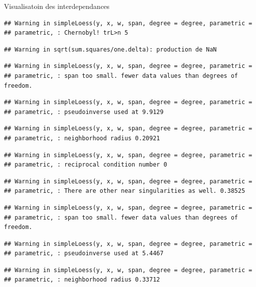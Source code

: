\documentclass[11pt,ignorenonframetext,]{beamer}
\begin{document}
\begin{frame}[fragile]{Visualisatoin des interdependances}
\begin{verbatim}
## Warning in simpleLoess(y, x, w, span, degree = degree, parametric =
## parametric, : Chernobyl! trL>n 5
\end{verbatim}

\begin{verbatim}
## Warning in sqrt(sum.squares/one.delta): production de NaN
\end{verbatim}

\begin{verbatim}
## Warning in simpleLoess(y, x, w, span, degree = degree, parametric =
## parametric, : span too small. fewer data values than degrees of freedom.
\end{verbatim}

\begin{verbatim}
## Warning in simpleLoess(y, x, w, span, degree = degree, parametric =
## parametric, : pseudoinverse used at 9.9129
\end{verbatim}

\begin{verbatim}
## Warning in simpleLoess(y, x, w, span, degree = degree, parametric =
## parametric, : neighborhood radius 0.20921
\end{verbatim}

\begin{verbatim}
## Warning in simpleLoess(y, x, w, span, degree = degree, parametric =
## parametric, : reciprocal condition number 0
\end{verbatim}

\begin{verbatim}
## Warning in simpleLoess(y, x, w, span, degree = degree, parametric =
## parametric, : There are other near singularities as well. 0.38525
\end{verbatim}

\begin{verbatim}
## Warning in simpleLoess(y, x, w, span, degree = degree, parametric =
## parametric, : span too small. fewer data values than degrees of freedom.
\end{verbatim}

\begin{verbatim}
## Warning in simpleLoess(y, x, w, span, degree = degree, parametric =
## parametric, : pseudoinverse used at 5.4467
\end{verbatim}

\begin{verbatim}
## Warning in simpleLoess(y, x, w, span, degree = degree, parametric =
## parametric, : neighborhood radius 0.33712
\end{verbatim}


\end{frame}
\end{document}
